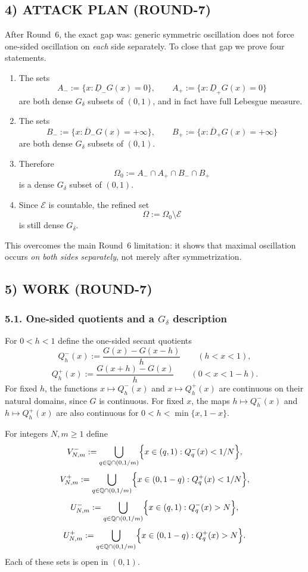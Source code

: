 \subsection{4) ATTACK PLAN (ROUND-7)}

After Round~6, the exact gap was: generic symmetric oscillation does not force one-sided oscillation on \emph{each} side separately.
To close that gap we prove four statements.

\begin{enumerate}
\item The sets
\[
A_-:=\{x:\underline D_-G(x)=0\},
\qquad
A_+:=\{x:\underline D_+G(x)=0\}
\]
are both dense $G_\delta$ subsets of $(0,1)$, and in fact have full Lebesgue measure.

\item The sets
\[
B_-:=\{x:\overline D_-G(x)=+\infty\},
\qquad
B_+:=\{x:\overline D_+G(x)=+\infty\}
\]
are both dense $G_\delta$ subsets of $(0,1)$.

\item Therefore
\[
\Omega_0:=A_-\cap A_+\cap B_-\cap B_+
\]
is a dense $G_\delta$ subset of $(0,1)$.

\item Since $\mathcal E$ is countable, the refined set
\[
\Omega:=\Omega_0\setminus\mathcal E
\]
is still dense $G_\delta$.
\end{enumerate}

This overcomes the main Round~6 limitation: it shows that maximal oscillation occurs \emph{on both sides separately}, not merely after symmetrization.

\subsection{5) WORK (ROUND-7)}

\subsubsection*{5.1. One-sided quotients and a $G_\delta$ description}

For $0<h<1$ define the one-sided secant quotients
\[
Q_h^-(x):=\frac{G(x)-G(x-h)}{h}\qquad(h<x<1),
\]
\[
Q_h^+(x):=\frac{G(x+h)-G(x)}{h}\qquad(0<x<1-h).
\]
For fixed $h$, the functions $x\mapsto Q_h^-(x)$ and $x\mapsto Q_h^+(x)$ are continuous on their natural domains, since $G$ is continuous.
For fixed $x$, the maps $h\mapsto Q_h^-(x)$ and $h\mapsto Q_h^+(x)$ are also continuous for $0<h<\min\{x,1-x\}$.

For integers $N,m\ge1$ define
\[
V^-_{N,m}:=\bigcup_{q\in\mathbb Q\cap(0,1/m)}\Bigl\{x\in(q,1):Q_q^-(x)<1/N\Bigr\},
\]
\[
V^+_{N,m}:=\bigcup_{q\in\mathbb Q\cap(0,1/m)}\Bigl\{x\in(0,1-q):Q_q^+(x)<1/N\Bigr\},
\]
\[
U^-_{N,m}:=\bigcup_{q\in\mathbb Q\cap(0,1/m)}\Bigl\{x\in(q,1):Q_q^-(x)>N\Bigr\},
\]
\[
U^+_{N,m}:=\bigcup_{q\in\mathbb Q\cap(0,1/m)}\Bigl\{x\in(0,1-q):Q_q^+(x)>N\Bigr\}.
\]
Each of these sets is open in $(0,1)$.

